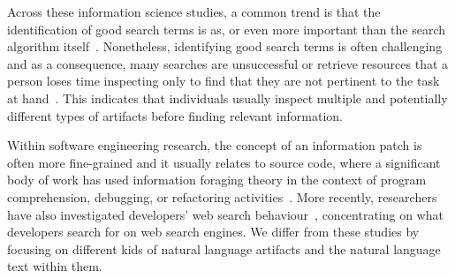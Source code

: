 









Across these information science studies, 
a common trend is that the identification of good search terms is as, or even more
important than the search algorithm itself~\cite{Kevic2014}. 
Nonetheless, identifying good search terms is often challenging and 
as a consequence, many searches are unsuccessful or retrieve resources that 
a person loses time inspecting only to find that they are not pertinent to the task at hand~\cite{novotny2004don, Haiduc2013}.
This indicates that individuals usually inspect multiple and potentially different types of artifacts 
before finding relevant information.




Within software engineering research, the concept of an information patch 
is often more fine-grained and it usually relates to source code, where a significant body of work has 
used information foraging theory in the context of 
program comprehension, debugging, or refactoring activities~\cite{fleming2013, lawrance2010, piorkowski2013, Ko2006a}. More recently, researchers have also investigated developers' web search 
behaviour~\cite{Starke2009, Brandt2009a, Xia2017}, concentrating on what developers search for on web search engines. 
We differ from these studies by focusing 
on different kids of natural language artifacts and 
the natural language text within them.






